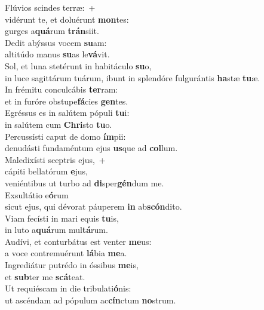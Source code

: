 \oddverse Flúvios scindes terræ:~+\\
\oddverse  vidérunt te, et doluérunt \textbf{mon}tes:~\*\\
\oddverse gurges a\textbf{quá}rum \textbf{trán}siit.\\
\evenverse Dedit abýssus vocem \textbf{su}am:~\*\\
\evenverse altitúdo manus \textbf{su}as le\textbf{vá}vit.\\
\oddverse Sol, et luna stetérunt in habitáculo \textbf{su}o,~\*\\
\oddverse in luce sagittárum tuárum, ibunt in splendóre fulgurántis \textbf{ha}stæ \textbf{tu}æ.\\
\evenverse In frémitu conculcábis \textbf{ter}ram:~\*\\
\evenverse et in furóre obstupe\textbf{fá}cies \textbf{gen}tes.\\
\oddverse Egréssus es in salútem pópuli \textbf{tu}i:~\*\\
\oddverse in salútem cum \textbf{Chri}sto \textbf{tu}o.\\
\evenverse Percussísti caput de domo \textbf{ím}pii:~\*\\
\evenverse denudásti fundaméntum ejus \textbf{us}que ad \textbf{col}lum.\\
\oddverse Maledixísti sceptris ejus,~+\\
\oddverse  cápiti bellatórum \textbf{e}jus,~\*\\
\oddverse veniéntibus ut turbo ad \textbf{di}sper\textbf{gén}dum me.\\
\evenverse Exsultátio e\textbf{ó}rum~\*\\
\evenverse sicut ejus, qui dévorat páuperem \textbf{in} ab\textbf{scón}dito.\\
\oddverse Viam fecísti in mari equis \textbf{tu}is,~\*\\
\oddverse in luto a\textbf{quá}rum mul\textbf{tá}rum.\\
\evenverse Audívi, et conturbátus est venter \textbf{me}us:~\*\\
\evenverse a voce contremuérunt \textbf{lá}bia \textbf{me}a.\\
\oddverse Ingrediátur putrédo in óssibus \textbf{me}is,~\*\\
\oddverse et \textbf{sub}ter me \textbf{scá}teat.\\
\evenverse Ut requiéscam in die tribulati\textbf{ó}nis:~\*\\
\evenverse ut ascéndam ad pópulum ac\textbf{cín}ctum \textbf{no}strum.\\

